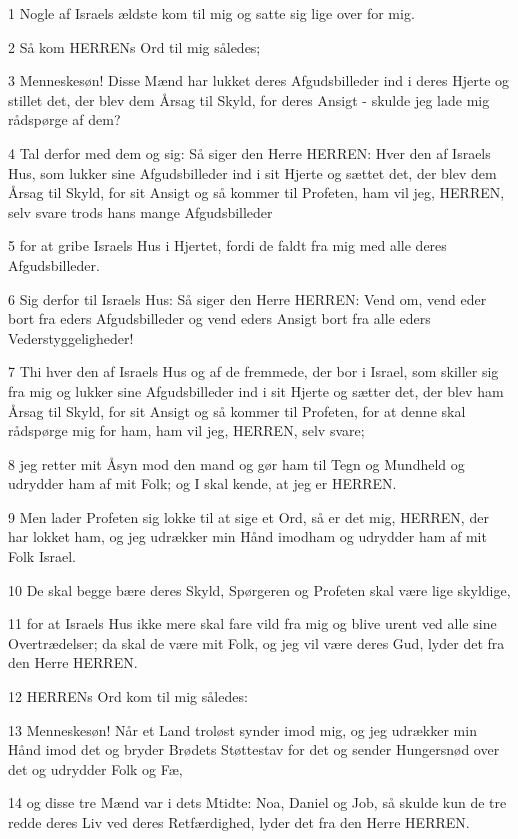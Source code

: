 \par 1 Nogle af Israels ældste kom til mig og satte sig lige over for mig.
\par 2 Så kom HERRENs Ord til mig således;
\par 3 Menneskesøn! Disse Mænd har lukket deres Afgudsbilleder ind i deres Hjerte og stillet det, der blev dem Årsag til Skyld, for deres Ansigt - skulde jeg lade mig rådspørge af dem?
\par 4 Tal derfor med dem og sig: Så siger den Herre HERREN: Hver den af Israels Hus, som lukker sine Afgudsbilleder ind i sit Hjerte og sættet det, der blev dem Årsag til Skyld, for sit Ansigt og så kommer til Profeten, ham vil jeg, HERREN, selv svare trods hans mange Afgudsbilleder
\par 5 for at gribe Israels Hus i Hjertet, fordi de faldt fra mig med alle deres Afgudsbilleder.
\par 6 Sig derfor til Israels Hus: Så siger den Herre HERREN: Vend om, vend eder bort fra eders Afgudsbilleder og vend eders Ansigt bort fra alle eders Vederstyggeligheder!
\par 7 Thi hver den af Israels Hus og af de fremmede, der bor i Israel, som skiller sig fra mig og lukker sine Afgudsbilleder ind i sit Hjerte og sætter det, der blev ham Årsag til Skyld, for sit Ansigt og så kommer til Profeten, for at denne skal rådspørge mig for ham, ham vil jeg, HERREN, selv svare;
\par 8 jeg retter mit Åsyn mod den mand og gør ham til Tegn og Mundheld og udrydder ham af mit Folk; og I skal kende, at jeg er HERREN.
\par 9 Men lader Profeten sig lokke til at sige et Ord, så er det mig, HERREN, der har lokket ham, og jeg udrækker min Hånd imodham og udrydder ham af mit Folk Israel.
\par 10 De skal begge bære deres Skyld, Spørgeren og Profeten skal være lige skyldige,
\par 11 for at Israels Hus ikke mere skal fare vild fra mig og blive urent ved alle sine Overtrædelser; da skal de være mit Folk, og jeg vil være deres Gud, lyder det fra den Herre HERREN.
\par 12 HERRENs Ord kom til mig således:
\par 13 Menneskesøn! Når et Land troløst synder imod mig, og jeg udrækker min Hånd imod det og bryder Brødets Støttestav for det og sender Hungersnød over det og udrydder Folk og Fæ,
\par 14 og disse tre Mænd var i dets Mtidte: Noa, Daniel og Job, så skulde kun de tre redde deres Liv ved deres Retfærdighed, lyder det fra den Herre HERREN.
